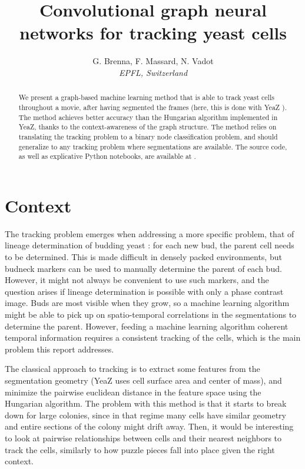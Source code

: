 \documentclass[10pt,conference,compsocconf,a4paper]{IEEEtran}
\begin{document}
\title{Convolutional graph neural networks for tracking yeast cells}

\author{
	G. Brenna, F. Massard, N. Vadot\\
	\textit{EPFL, Switzerland}
}

\maketitle

\begin{abstract}
	We present a graph-based machine learning method that is able to track yeast cells throughout a movie, after having segmented the frames (here, this is done with YeaZ \cite{dietler_convolutional_2020}). The method achieves better accuracy than the Hungarian algorithm implemented in YeaZ, thanks to the context-awareness of the graph structure. The method relies on translating the tracking problem to a binary node classification problem, and should generalize to any tracking problem where segmentations are available. The source code, as well as explicative Python notebooks, are available at \cite{vadot_cs-433_2021}.
\end{abstract}


\section{Context}

	The tracking problem emerges when addressing a more specific problem, that of lineage determination of budding yeast : for each new bud, the parent cell needs to be determined. This is made difficult in densely packed environments, but budneck markers can be used to manually determine the parent of each bud. However, it might not always be convenient to use such markers, and the question arises if lineage determination is possible with only a phase contrast image. Buds are most visible when they grow, so a machine learning algorithm might be able to pick up on spatio-temporal correlations in the segmentations to determine the parent. However, feeding a machine learning algorithm coherent temporal information requires a consistent tracking of the cells, which is the main problem this report addresses.

	The classical approach to tracking is to extract some features from the segmentation geometry (YeaZ uses cell surface area and center of mass), and minimize the pairwise euclidean distance in the feature space using the Hungarian algorithm. The problem with this method is that it starts to break down for large colonies, since in that regime many cells have similar geometry and entire sections of the colony might drift away. Then, it would be interesting to look at pairwise relationships between cells and their nearest neighbors to track the cells, similarly to how puzzle pieces fall into place given the right context.
\end{document}

